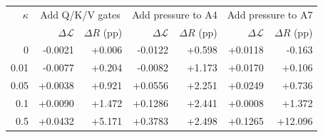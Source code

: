 \begin{tabular}{rrrrrrr}
\toprule
$\kappa$ & \multicolumn{2}{c}{Add Q/K/V gates} & \multicolumn{2}{c}{Add pressure to A4} & \multicolumn{2}{c}{Add pressure to A7} \\
 & $\Delta\mathcal{L}$ & $\Delta R$ (pp) & $\Delta\mathcal{L}$ & $\Delta R$ (pp) & $\Delta\mathcal{L}$ & $\Delta R$ (pp) \\
\midrule
0 & -0.0021 & +0.006 & -0.0122 & +0.598 & +0.0118 & -0.163 \\
0.01 & -0.0077 & +0.204 & -0.0082 & +1.173 & +0.0170 & +0.106 \\
0.05 & +0.0038 & +0.921 & +0.0556 & +2.251 & +0.0249 & +0.736 \\
0.1 & +0.0090 & +1.472 & +0.1286 & +2.441 & +0.0008 & +1.372 \\
0.5 & +0.0432 & +5.171 & +0.3783 & +2.498 & +0.1265 & +12.096 \\
\bottomrule
\end{tabular}
